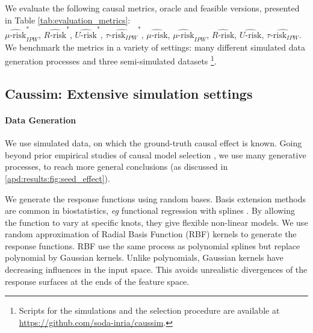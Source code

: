 \documentclass[french,12pt,twoside,a4paper]{book}
\begin{document}

We evaluate the following causal metrics, oracle and feasible
versions, presented in Table
\ref{tab:evaluation_metrics}:\\
$\widehat{\mu\text{-risk}}_{IPW}^*$,
$\widehat{R\text{-risk}}^*$,
$\widehat{U\text{-risk}}^*$,
$\widehat{\tau\text{-risk}_{IPW}}^*$,
$\widehat{\mu\text{-risk}}$,
$\widehat{\mu\text{-risk}}_{IPW}$,
$\widehat{R\text{-risk}}$,
$\widehat{U\text{-risk}}$,
$\widehat{\tau\text{-risk}_{IPW}}$.
We benchmark the metrics in a variety of settings:
many different simulated data generation
processes and three semi-simulated datasets \footnote{Scripts for the simulations and the selection procedure are available at
  \url{https://github.com/soda-inria/caussim}.
}.

\subsection{Caussim: Extensive simulation settings}\label{subsec:simulations}

\paragraph{Data Generation}

We use simulated data, on which the ground-truth causal effect is known. Going
beyond prior empirical studies of causal model selection
\citep{schuler_comparison_2018,alaa_validating_2019}, we use many
generative processes, to reach more general conclusions (as discussed
in \ref{apd:results:fig:seed_effect}).

We generate the response functions using random bases. Basis extension methods
are common in biostatistics, \emph{eg} functional regression with splines
\citep{howe_splines_2011, perperoglou_review_2019}. By allowing the function to
vary at specific knots, they give flexible non-linear models. We use random approximation of Radial Basis Function (RBF) kernels
\citep{rahimi_random_2008} to generate the response functions. RBF use the same
process as polynomial splines but replace polynomial by Gaussian kernels. Unlike
polynomials, Gaussian kernels have decreasing influences in the input space.
This avoids unrealistic divergences of the response surfaces at the
ends of the feature space.
\end{document}
